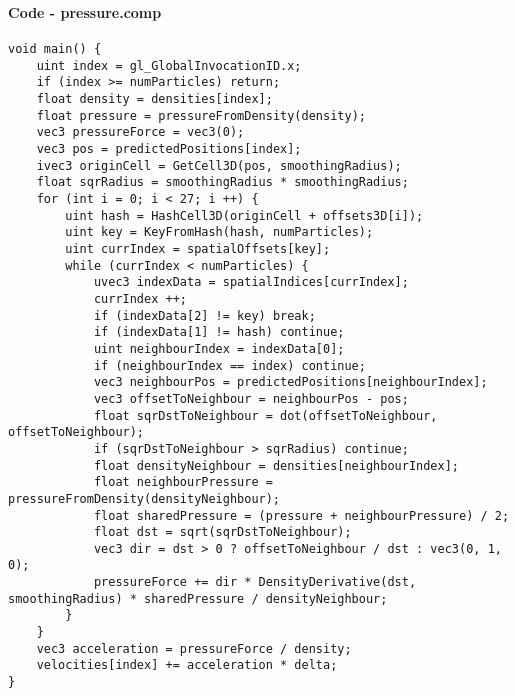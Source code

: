 \begin{frame}[fragile]
    \frametitle{\anxpti}
    \framesubtitle{Code - pressure.comp}

    \begin{verbatim}
void main() {
    uint index = gl_GlobalInvocationID.x;
    if (index >= numParticles) return;
    float density = densities[index];
    float pressure = pressureFromDensity(density);
    vec3 pressureForce = vec3(0);
    vec3 pos = predictedPositions[index];
    ivec3 originCell = GetCell3D(pos, smoothingRadius);
    float sqrRadius = smoothingRadius * smoothingRadius;
    for (int i = 0; i < 27; i ++) {
        uint hash = HashCell3D(originCell + offsets3D[i]);
        uint key = KeyFromHash(hash, numParticles);
        uint currIndex = spatialOffsets[key];
        while (currIndex < numParticles) {
            uvec3 indexData = spatialIndices[currIndex];
            currIndex ++;
            if (indexData[2] != key) break;
            if (indexData[1] != hash) continue;
            uint neighbourIndex = indexData[0];
            if (neighbourIndex == index) continue;
            vec3 neighbourPos = predictedPositions[neighbourIndex];
            vec3 offsetToNeighbour = neighbourPos - pos;
            float sqrDstToNeighbour = dot(offsetToNeighbour, offsetToNeighbour);
            if (sqrDstToNeighbour > sqrRadius) continue;
            float densityNeighbour = densities[neighbourIndex];
            float neighbourPressure = pressureFromDensity(densityNeighbour);
            float sharedPressure = (pressure + neighbourPressure) / 2;
            float dst = sqrt(sqrDstToNeighbour);
            vec3 dir = dst > 0 ? offsetToNeighbour / dst : vec3(0, 1, 0);
            pressureForce += dir * DensityDerivative(dst, smoothingRadius) * sharedPressure / densityNeighbour;
        }
    }
    vec3 acceleration = pressureForce / density;
    velocities[index] += acceleration * delta;
}
    \end{verbatim}
\end{frame}

